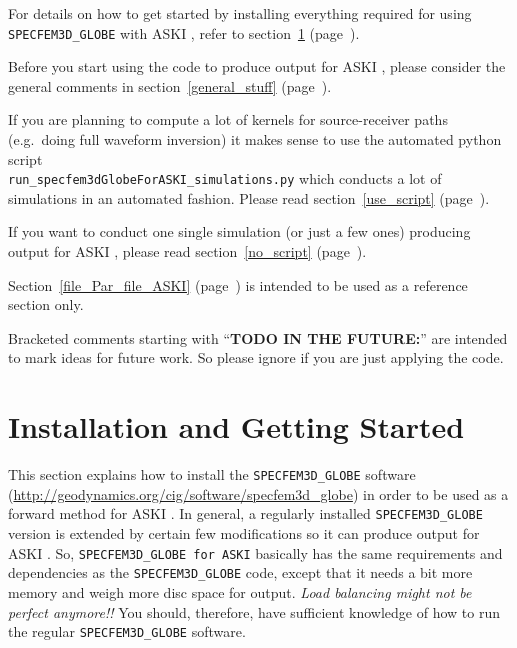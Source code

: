 \documentclass[12pt,a4paper]{article}
\newcommand{\lcode}[1]{\nolinkurl{#1}}
\newcommand{\ASKI}{ {\ttfamily ASKI} }
\newcommand{\myref}[1]{\ref{#1} (page~\pageref{#1})}
\begin{document}
For details on how to get started by installing everything required for using \lcode{SPECFEM3D_GLOBE} 
with \ASKI{}, refer to section~\myref{install}{}. 

Before you start using the code to produce output for \ASKI{}, please consider the general
comments in section~\myref{general_stuff}.

If you are planning to compute a lot of kernels for source-receiver paths (e.g.\ doing full waveform inversion) 
it makes sense to use the automated python script \\ \lcode{run_specfem3dGlobeForASKI_simulations.py} 
which conducts a lot of simulations in an automated fashion. Please read section~\myref{use_script}. 

If you want to conduct one single simulation (or just a few ones) producing output for \ASKI{}, please 
read section~\myref{no_script}.

Section~\myref{file_Par_file_ASKI} is intended to be used as a reference section only.

Bracketed comments starting with ``{\bf TODO IN THE FUTURE:}'' are intended to mark ideas for future work. 
So please ignore if you are just applying the code.
%
\newpage
\tableofcontents
\newpage
%
\section{Installation and Getting Started} \label{install}
%
This section explains how to install the \lcode{SPECFEM3D_GLOBE} software 
(\url{http://geodynamics.org/cig/software/specfem3d_globe})
in order to be used as a forward method for \ASKI{}. 
In general, a regularly installed \lcode{SPECFEM3D_GLOBE} version is extended by certain few modifications 
so it can produce output for \ASKI{}. So, \lcode{SPECFEM3D_GLOBE for ASKI} basically has the same requirements 
and dependencies as the \lcode{SPECFEM3D_GLOBE} code, except that it needs a bit more memory and weigh more 
disc space for output. \emph{Load balancing might not be perfect anymore!!} You should, therefore, have sufficient 
knowledge of how to run the regular \lcode{SPECFEM3D_GLOBE} software. 

\end{document}
